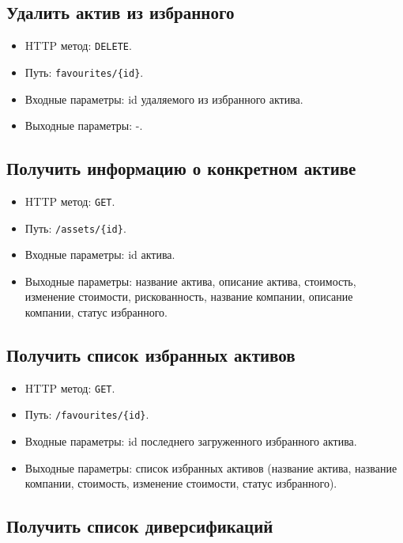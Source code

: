 \documentclass[a4paper, 14pt]{article}
\begin{document}
\subsection{Удалить актив из избранного}

\begin{itemize}
    \item HTTP метод: \texttt{DELETE}.
    \item Путь: \texttt{favourites/\{id\}}.
    \item Входные параметры: id удаляемого из избранного актива.
    \item Выходные параметры: -.
\end{itemize}

\subsection{Получить информацию о конкретном активе}

\begin{itemize}
    \item HTTP метод: \texttt{GET}.
    \item Путь: \texttt{/assets/\{id\}}.
    \item Входные параметры: id актива.
    \item Выходные параметры: название актива, описание актива, стоимость, изменение стоимости, рискованность, название компании, описание компании, статус избранного.
\end{itemize}

\subsection{Получить список избранных активов}

\begin{itemize}
    \item HTTP метод: \texttt{GET}.
    \item Путь: \texttt{/favourites/\{id\}}.
    \item Входные параметры: id последнего загруженного избранного актива.
    \item Выходные параметры: список избранных активов (название актива, название компании, стоимость, изменение стоимости, статус избранного).
\end{itemize}

\subsection{Получить список диверсификаций}
\end{document}
